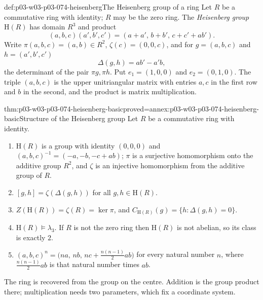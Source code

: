 \begin{hbdefinition}{def:p03-w03-p03-074-heisenberg}{The Heisenberg group of a ring}
Let \(R\) be a commutative ring with identity; \(R\) may be the zero
ring. The \emph{Heisenberg group} \(\mathrm H(R)\) has domain \(R^3\) and
product
\[
  (a,b,c)(a',b',c')=(a+a',\,b+b',\,c+c'+ab').
\]
Write \(\pi(a,b,c)=(a,b)\in R^2\), \(\zeta(c)=(0,0,c)\), and for
\(g=(a,b,c)\) and \(h=(a',b',c')\)
\[
  \Delta(g,h)=ab'-a'b,
\]
the determinant of the pair \(\pi g,\pi h\). Put
\(e_1=(1,0,0)\) and \(e_2=(0,1,0)\). The triple \((a,b,c)\) is the
upper unitriangular matrix with entries \(a,c\) in the first row and
\(b\) in the second, and the product is matrix multiplication.
\end{hbdefinition}

\begin{hblemma}{thm:p03-w03-p03-074-heisenberg-basic}{proved=annex:p03-w03-p03-074-heisenberg-basic}{Structure of the Heisenberg group}
Let \(R\) be a commutative ring with identity.
\begin{enumerate}
  \item \(\mathrm H(R)\) is a group with identity \((0,0,0)\) and
        \((a,b,c)^{-1}=(-a,-b,-c+ab)\); \(\pi\) is a surjective
        homomorphism onto the additive group \(R^2\), and \(\zeta\) is an
        injective homomorphism from the additive group of \(R\).
  \item \([g,h]=\zeta(\Delta(g,h))\) for all \(g,h\in\mathrm H(R)\).
  \item \(Z(\mathrm H(R))=\zeta(R)=\ker\pi\), and
        \(C_{\mathrm H(R)}(g)=\{h:\Delta(g,h)=0\}\).
  \item \(\mathrm H(R)\models\lambda_3\). If \(R\) is not the zero
        ring then \(\mathrm H(R)\) is not abelian, so its class is
        exactly \(2\).
  \item \((a,b,c)^n=\bigl(na,\,nb,\,nc+\tfrac{n(n-1)}2ab\bigr)\) for every
        natural number \(n\), where \(\tfrac{n(n-1)}2ab\) is that natural
        number times \(ab\).
\end{enumerate}
\end{hblemma}

The ring is recovered from the group on the centre. Addition is the group
product there; multiplication needs two parameters, which fix a
coordinate system.

